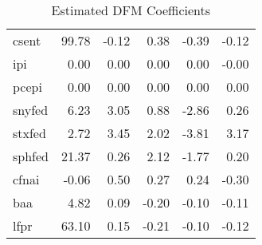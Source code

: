 \documentclass[11pt, letterpaper]{article}\usepackage[]{graphicx}\usepackage[]{color}
\begin{document}
\begin{table}[H]
\begin{tabular}{lrrrrr}
  csent & 99.78 & -0.12 & 0.38 & -0.39 & -0.12 \\ 
  ipi & 0.00 & 0.00 & 0.00 & 0.00 & -0.00 \\ 
  pcepi & 0.00 & 0.00 & 0.00 & 0.00 & 0.00 \\ 
  snyfed & 6.23 & 3.05 & 0.88 & -2.86 & 0.26 \\ 
  stxfed & 2.72 & 3.45 & 2.02 & -3.81 & 3.17 \\ 
  sphfed & 21.37 & 0.26 & 2.12 & -1.77 & 0.20 \\ 
  cfnai & -0.06 & 0.50 & 0.27 & 0.24 & -0.30 \\ 
  baa & 4.82 & 0.09 & -0.20 & -0.10 & -0.11 \\ 
  lfpr & 63.10 & 0.15 & -0.21 & -0.10 & -0.12 \\ 
   \hline
\end{tabular}
\endgroup
\caption{Estimated DFM Coefficients} 
\end{table}
\end{document}
